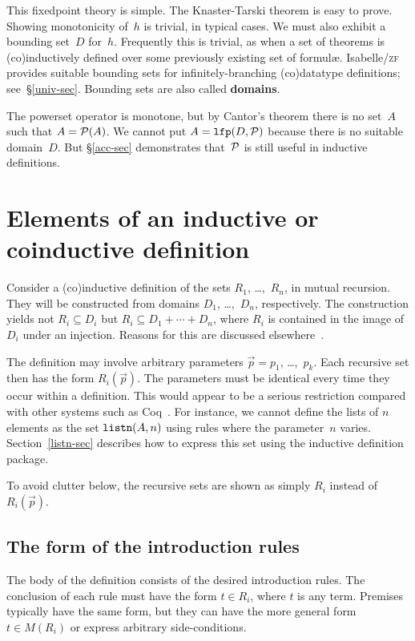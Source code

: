 \documentclass[12pt]{article}
\newcommand\sbs{\subseteq}
\newcommand\defn[1]{{\bf#1}}
\newcommand\pow{{\cal P}}
\newcommand\lfp{\hbox{\tt lfp}}
\newcommand\listn{\hbox{\tt listn}}
\begin{document}
This fixedpoint theory is simple.  The Knaster-Tarski theorem is easy to
prove.  Showing monotonicity of~$h$ is trivial, in typical cases.  We must
also exhibit a bounding set~$D$ for~$h$.  Frequently this is trivial, as when
a set of theorems is (co)inductively defined over some previously existing set
of formul{\ae}.  Isabelle/\textsc{zf} provides suitable bounding sets for
infinitely-branching (co)datatype definitions; see~\S\ref{univ-sec}.  Bounding
sets are also called \defn{domains}.

The powerset operator is monotone, but by Cantor's theorem there is no
set~$A$ such that $A=\pow(A)$.  We cannot put $A=\lfp(D,\pow)$ because
there is no suitable domain~$D$.  But \S\ref{acc-sec} demonstrates
that~$\pow$ is still useful in inductive definitions.

\section{Elements of an inductive or coinductive definition}\label{basic-sec}
Consider a (co)inductive definition of the sets $R_1$, \ldots,~$R_n$, in
mutual recursion.  They will be constructed from domains $D_1$,
\ldots,~$D_n$, respectively.  The construction yields not $R_i\sbs D_i$ but
$R_i\sbs D_1+\cdots+D_n$, where $R_i$ is contained in the image of~$D_i$
under an injection.  Reasons for this are discussed
elsewhere~\cite[\S4.5]{paulson-set-II}.

The definition may involve arbitrary parameters $\vec{p}=p_1$,
\ldots,~$p_k$.  Each recursive set then has the form $R_i(\vec{p})$.  The
parameters must be identical every time they occur within a definition.  This
would appear to be a serious restriction compared with other systems such as
Coq~\cite{paulin-tlca}.  For instance, we cannot define the lists of
$n$ elements as the set $\listn(A,n)$ using rules where the parameter~$n$
varies.  Section~\ref{listn-sec} describes how to express this set using the
inductive definition package.

To avoid clutter below, the recursive sets are shown as simply $R_i$
instead of~$R_i(\vec{p})$.

\subsection{The form of the introduction rules}\label{intro-sec}
The body of the definition consists of the desired introduction rules.  The
conclusion of each rule must have the form $t\in R_i$, where $t$ is any term.
Premises typically have the same form, but they can have the more general form
$t\in M(R_i)$ or express arbitrary side-conditions.
\end{document}
